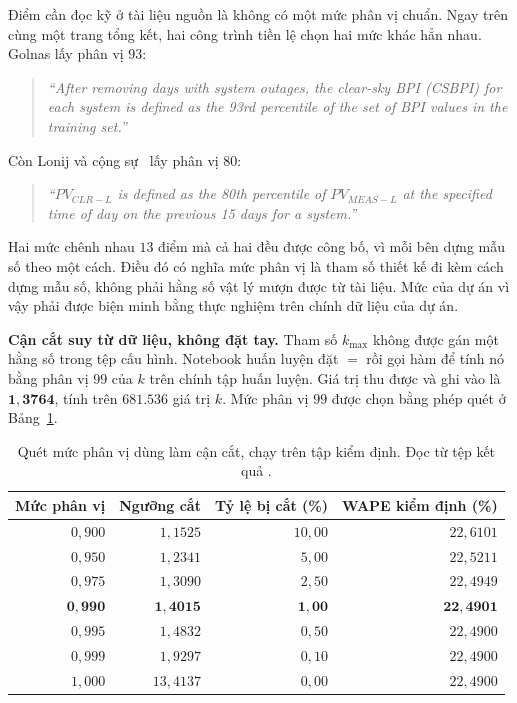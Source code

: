 Điểm cần đọc kỹ ở tài liệu nguồn là không có một mức phân vị chuẩn. Ngay trên cùng
một trang tổng kết, hai công trình tiền lệ chọn hai mức khác hẳn nhau. Golnas lấy
phân vị $93$:

\begin{quote}\small
\textit{``After removing days with system outages, the clear-sky BPI (CSBPI) for each system is defined as the 93rd percentile of the set of BPI values in the training set.''}
\end{quote}

Còn Lonij và cộng sự~\cite{lonij2012tucson} lấy phân vị $80$:

\begin{quote}\small
\textit{``$PV_{CLR-L}$ is defined as the 80th percentile of $PV_{MEAS-L}$ at the specified time of day on the previous 15 days for a system.''}
\end{quote}


Hai mức chênh nhau $13$ điểm mà cả hai đều được công bố, vì mỗi bên dựng mẫu số theo một cách.
Điều đó có nghĩa mức phân vị là tham số thiết kế đi kèm cách dựng mẫu số, không phải
hằng số vật lý mượn được từ tài liệu. Mức của dự án vì vậy phải được biện minh bằng thực
nghiệm trên chính dữ liệu của dự án.

\textbf{Cận cắt suy từ dữ liệu, không đặt tay.} Tham số $k_{\max}$ không được gán một hằng số
trong tệp cấu hình. Notebook huấn luyện đặt ${}={}$ rồi gọi hàm
 để tính nó bằng phân vị $99$ của $k$ trên chính tập huấn luyện.
Giá trị thu được và ghi vào  là $\mathbf{1{,}3764}$, tính trên
$681.536$ giá trị $k$. Mức phân vị $99$ được chọn bằng phép quét ở
Bảng~\ref{tab:quet_phan_vi}.

\begin{table}[htbp]
\centering

\small
\begin{tabular}{r r r r}
\toprule
\textbf{Mức phân vị} & \textbf{Ngưỡng cắt} & \textbf{Tỷ lệ bị cắt (\%)} & \textbf{WAPE kiểm định (\%)} \\
\midrule
$0{,}900$ & $1{,}1525$ & $10{,}00$ & $22{,}6101$ \\
$0{,}950$ & $1{,}2341$ & $5{,}00$  & $22{,}5211$ \\
$0{,}975$ & $1{,}3090$ & $2{,}50$  & $22{,}4949$ \\
$\mathbf{0{,}990}$ & $\mathbf{1{,}4015}$ & $\mathbf{1{,}00}$ & $\mathbf{22{,}4901}$ \\
$0{,}995$ & $1{,}4832$ & $0{,}50$  & $22{,}4900$ \\
$0{,}999$ & $1{,}9297$ & $0{,}10$  & $22{,}4900$ \\
$1{,}000$ & $13{,}4137$ & $0{,}00$ & $22{,}4900$ \\
\bottomrule
\end{tabular}
\caption[Quét mức phân vị dùng làm cận cắt, chạy trên tập kiểm định]{Quét mức phân vị dùng làm cận cắt, chạy trên tập kiểm định. Đọc từ tệp kết
quả .}
\label{tab:quet_phan_vi}
\end{table}

